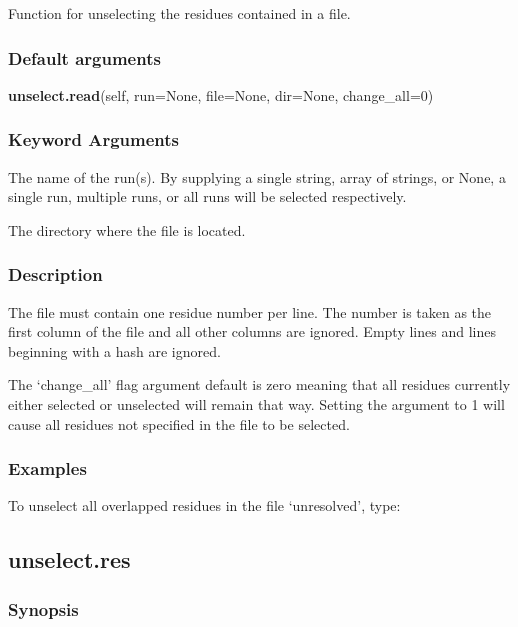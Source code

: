 Function for unselecting the residues contained in a file.

\subsubsection{Default arguments}

\textsf{\textbf{unselect.read}(self, run=None, file=None, dir=None, change\_all=0)}


\subsubsection{Keyword Arguments}

  The name of the run(s).  By supplying a single string, array of strings, or None, a single run, multiple runs, or all runs will be selected respectively.

  The directory where the file is located.


\subsubsection{Description}

The file must contain one residue number per line.  The number is taken as the first column
of the file and all other columns are ignored.  Empty lines and lines beginning with a hash
are ignored.

The `change\_all' flag argument default is zero meaning that all residues currently either
selected or unselected will remain that way.  Setting the argument to 1 will cause all
residues not specified in the file to be selected.


\subsubsection{Examples}

To unselect all overlapped residues in the file `unresolved', type:




\newpage

\subsection{unselect.res}


\subsubsection{Synopsis}

